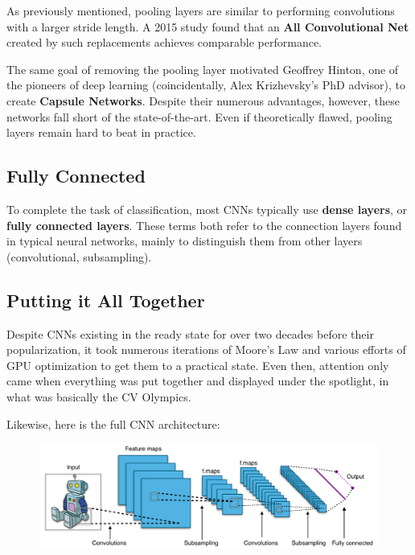 \documentclass{article}
\begin{document}
As previously mentioned, pooling layers are similar to performing convolutions with a larger stride length. A 2015 study found that an \textbf{All Convolutional Net} created by such replacements achieves comparable performance.

The same goal of removing the pooling layer motivated Geoffrey Hinton, one of the pioneers of deep learning (coincidentally, Alex Krizhevsky's PhD advisor), to create \textbf{Capsule Networks}. Despite their numerous advantages, however, these networks fall short of the state-of-the-art. Even if theoretically flawed, pooling layers remain hard to beat in practice.

\subsection{Fully Connected}
To complete the task of classification, most CNNs typically use \textbf{dense layers}, or \textbf{fully connected layers}. These terms both refer to the connection layers found in typical neural networks, mainly to distinguish them from other layers (convolutional, subsampling).

\subsection{Putting it All Together}
Despite CNNs existing in the ready state for over two decades before their popularization, it took numerous iterations of Moore's Law and various efforts of GPU optimization to get them to a practical state. Even then, attention only came when everything was put together and displayed under the spotlight, in what was basically the CV Olympics.

Likewise, here is the full CNN architecture:

\begin{figure}[!htb]
  \centering
  \vspace{-3pt}
  \includegraphics[width=1.0\textwidth]{cnn.png}
  \vspace{-5pt}
  \vspace{-20pt}
\end{figure}

\end{document}
